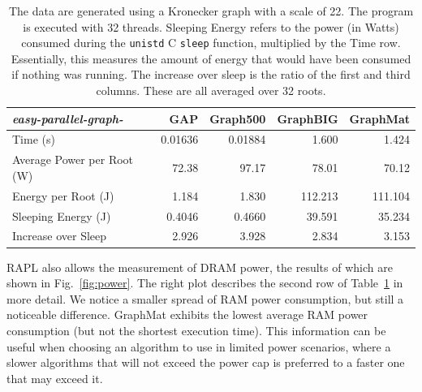 \documentclass[conference]{IEEEtran}
\begin{document}
\begin{table}
	\caption{The data are generated using a Kronecker graph with a scale of 22. The program is executed with 32 threads. Sleeping Energy refers to the power (in Watts) consumed during the \texttt{unistd} C \texttt{sleep} function, multiplied by the Time row. Essentially, this measures the amount of energy that would have been consumed if nothing was running. The increase over sleep is the ratio of the first and third columns. These are all averaged over 32 roots.}
	\centering
	\begin{tabular}{l|r|r|r|r}
		\large{\emph{easy-parallel-graph\mbox{-\textasteriskcentered}}}	&	GAP  &    Graph500 & GraphBIG & GraphMat \\ \hline
		Time (s) &  0.01636 & 0.01884 & 1.600 & 1.424 \\
		Average Power per Root (W) & 72.38 & 97.17 & 78.01 & 70.12 \\
		Energy per Root (J) &	1.184 & 1.830 & 112.213 & 111.104 \\
		Sleeping Energy (J) & 0.4046  & 0.4660 & 39.591 &  35.234 \\
		Increase over Sleep & 2.926 & 3.928 & 2.834 & 3.153
	\end{tabular}
	\label{tab:power}
\end{table}

RAPL also allows the measurement of DRAM power, the results of which are shown in Fig.~\ref{fig:power}. The right plot describes the second row of Table~\ref{tab:power} in more detail. We notice a smaller spread of RAM power consumption, but still a noticeable difference. GraphMat exhibits the lowest average RAM power consumption (but not the shortest execution time). This information can be useful when choosing an algorithm to use in limited power scenarios, where a slower algorithms that will not exceed the power cap is preferred to a faster one that may exceed it.
\end{document}
